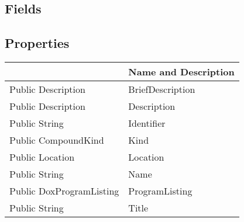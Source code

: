 \documentclass[11pt, oneside, a4paper]{book}
\begin{document}
\subsection{Fields}

\subsection{Properties}
\begin{center}
\begin{tabular}{| p{3cm} | p{12cm} | }
\hline
\textbf{ } & \textbf{ Name and Description}\\
\hline
 Public  Description &  BriefDescription\hypertarget{SoftwareEngineeringTools.{}Documentation.{}Compound.{}BriefDescription}{}\\
\hline
 Public  Description &  Description\hypertarget{SoftwareEngineeringTools.{}Documentation.{}Compound.{}Description}{}\\
\hline
 Public  String &  Identifier\hypertarget{SoftwareEngineeringTools.{}Documentation.{}Compound.{}Identifier}{}\\
\hline
 Public  CompoundKind &  Kind\hypertarget{SoftwareEngineeringTools.{}Documentation.{}Compound.{}Kind}{}\\
\hline
 Public  Location &  Location\hypertarget{SoftwareEngineeringTools.{}Documentation.{}Compound.{}Location}{}\\
\hline
 Public  String &  Name\hypertarget{SoftwareEngineeringTools.{}Documentation.{}Compound.{}Name}{}\\
\hline
 Public  DoxProgramListing &  ProgramListing\hypertarget{SoftwareEngineeringTools.{}Documentation.{}Compound.{}ProgramListing}{}\\
\hline
 Public  String &  Title\hypertarget{SoftwareEngineeringTools.{}Documentation.{}Compound.{}Title}{}\\
\hline
\end{tabular}
\end{center}
\end{document}
